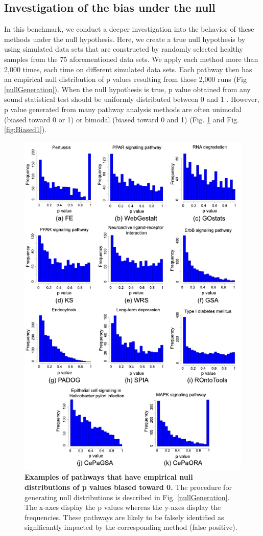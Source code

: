\subsection{Investigation of the bias under the null}

In this benchmark, we conduct a deeper investigation into the behavior of these methods under the null hypothesis. 
Here, we create a true null hypothesis by using simulated data sets that are constructed by randomly selected healthy samples from the 75 aforementioned data sets.
We apply each method  more than 2,000 times, each time on different simulated data sets.
Each pathway then has an empirical null distribution of p values resulting from those 2,000 runs (Fig \ref{nullGeneration}).
When the null hypothesis is true, p value obtained from any sound statistical test should be uniformly distributed  between 0 and 1 \cite{barton2013correction, fodor2007towards}.
However, p value generated from many pathway analysis methods are often unimodal (biased toward 0 or 1) or bimodal (biased toward 0 and 1) (Fig. \ref{fig:Biased0} and Fig. \ref{fig:Biased1}). 

\begin{figure}
\centering

	\includegraphics[width=0.8\linewidth]{Figures/Biased0}
	\caption{\textbf{Examples of pathways that have empirical null distributions of p values biased toward 0.} The procedure for generating null distributions is described in Fig. \ref{nullGeneration}. The x-axes display the p values whereas the y-axes display the frequencies. These pathways are likely to be falsely identified as significantly impacted by the corresponding method (false positive).}\label{fig:Biased0}
\end{figure}

